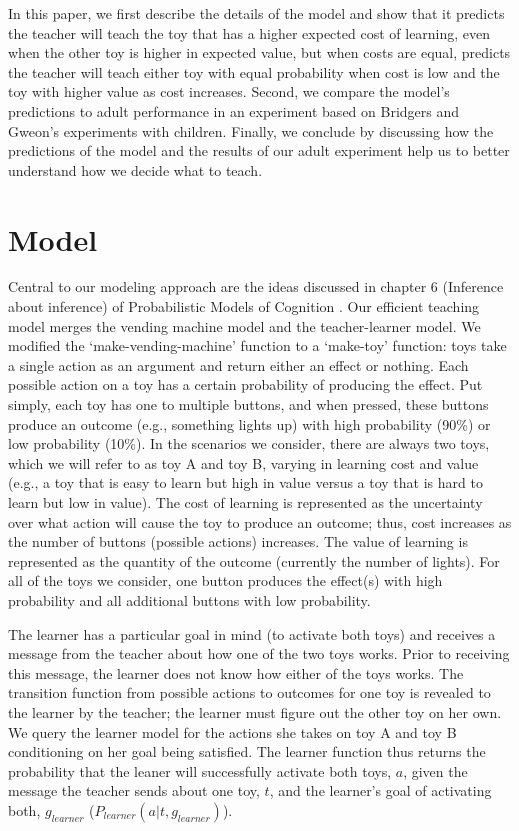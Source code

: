 \documentclass[10pt,letterpaper]{article}
\begin{document}
In this paper, we first describe the details of the model and show that it predicts the teacher will teach the toy that has a higher expected cost of learning, even when the other toy is higher in expected value, but when costs are equal, predicts the teacher will teach either toy with equal probability when cost is low and the toy with higher value as cost increases. Second, we compare the model's predictions to adult performance in an experiment based on Bridgers and Gweon's experiments with children. Finally, we conclude by discussing how the predictions of the model and the results of our adult experiment help us to better understand how we decide what to teach.

\section{Model}

Central to our modeling approach are the ideas discussed in chapter 6 (Inference about inference) of Probabilistic Models of Cognition \cite{Goodman}. Our efficient teaching model merges the vending machine model and the teacher-learner model.  We modified the `make-vending-machine' function to a `make-toy' function: toys take a single action as an argument and return either an effect or nothing. Each possible action on a toy has a certain probability of producing the effect. Put simply, each toy has one to multiple buttons, and when pressed, these buttons produce an outcome (e.g., something lights up) with high probability (90\%) or low probability (10\%). In the scenarios we consider, there are always two toys, which we will refer to as toy A and toy B, varying in learning cost and value (e.g., a toy that is easy to learn but high in value versus a toy that is hard to learn but low in value). The cost of learning is represented as the uncertainty over what action will cause the toy to produce an outcome; thus, cost increases as the number of buttons (possible actions) increases. The value of learning is represented as the quantity of the outcome (currently the number of lights). For all of the toys we consider, one button produces the effect(s) with high probability and all additional buttons with low probability. 

The learner has a particular goal in mind (to activate both toys) and receives a message from the teacher about how one of the two toys works. Prior to receiving this message, the learner does not know how either of the toys works. The transition function from possible actions to outcomes for one toy is revealed to the learner by the teacher; the learner must figure out the other toy on her own. We query the learner model for the actions she takes on toy A and toy B conditioning on her goal being satisfied. The learner function thus returns the probability that the leaner will successfully activate both toys, $a$, given the message the teacher sends about one toy, $t$, and the learner's goal of activating both, $g_{learner}$ ($P_{learner}(a | t, g_{learner})$). 
\end{document}

